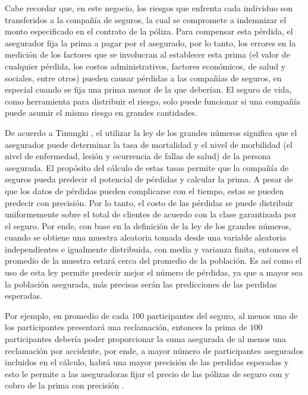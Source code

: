 \documentclass{article}
\begin{document}
Cabe recordar que, en este negocio, los riesgos que enfrenta cada individuo son transferidos a la compañía de seguros, la cual se compromete a indemnizar el monto especificado en el contrato de la póliza. Para compensar esta pérdida, el asegurador fija la prima a pagar por el asegurado, por lo tanto, los errores en la medición de los factores que se involucran al establecer esta prima (el valor de cualquier pérdida, los costos administrativos, factores económicos, de salud y sociales, entre otros) pueden causar pérdidas a las compañías de seguros, en especial cuando se fija una prima menor de la que deberían. El seguro de vida, como herramienta para distribuir el riesgo, solo puede funcionar si una compañía puede asumir el mismo riesgo en grandes cantidades.

De acuerdo a Tinungki \cite{Tinungki}, el utilizar la ley de los grandes números significa que el asegurador puede determinar la tasa de mortalidad y el nivel de morbilidad (el nivel de enfermedad, lesión y ocurrencia de fallas de salud) de la persona asegurada. El propósito del cálculo de estas tasas permite que la compañía de seguros pueda predecir el potencial de pérdidas y calcular la prima. A pesar de que los datos de pérdidas pueden complicarse con el tiempo, estas se pueden predecir con precisión. Por lo tanto, el costo de las pérdidas se puede distribuir uniformemente sobre el total de clientes de acuerdo con la clase garantizada por el seguro. Por ende, con base en la definición de la ley de los grandes números, cuando se obtiene una muestra aleatoria tomada desde una variable aleatoria independientes e igualmente distribuida, con media y varianza finita, entonces el promedio de la muestra estará cerca del promedio de la población. Es así como el uso de esta ley permite predecir mejor el número de pérdidas, ya que a mayor sea la población asegurada, más precisas serán las predicciones de las perdidas esperadas.

Por ejemplo, en promedio de cada $100$ participantes del seguro, al menos uno de los participantes presentará una reclamación, entonces la prima de $100$ participantes debería poder proporcionar la suma asegurada de al menos una reclamación por accidente, por ende, a mayor número de participantes asegurados incluidos en el cálculo, habrá una mayor precisión de las perdidas esperadas y esto le permite a las aseguradoras fijar el precio de las pólizas de seguro con y cobro de la prima con precisión \cite{smith}.
\end{document}

